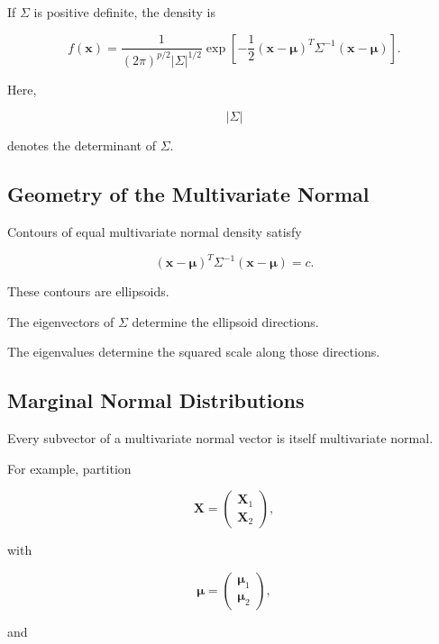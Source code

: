 If \(\Sigma\) is positive definite, the density is

\[
\boxed{
f(\mathbf{x})
=
\frac{
1
}{
(2\pi)^{p/2}
|\Sigma|^{1/2}
}
\exp
\left[
-\frac12
(
\mathbf{x}-\boldsymbol{\mu}
)^T
\Sigma^{-1}
(
\mathbf{x}-\boldsymbol{\mu}
)
\right].
}
\]

Here,

\[
|\Sigma|
\]

denotes the determinant of \(\Sigma\).

\subsection{Geometry of the Multivariate Normal}
\label{subsec:geometry-multivariate-normal}

Contours of equal multivariate normal density satisfy

\[
\boxed{
(
\mathbf{x}-\boldsymbol{\mu}
)^T
\Sigma^{-1}
(
\mathbf{x}-\boldsymbol{\mu}
)
=
c.
}
\]

These contours are ellipsoids.

The eigenvectors of \(\Sigma\) determine the ellipsoid directions.

The eigenvalues determine the squared scale along those directions.

\subsection{Marginal Normal Distributions}
\label{subsec:marginal-multivariate-normal}

Every subvector of a multivariate normal vector is itself multivariate
normal.

For example, partition

\[
\mathbf{X}
=
\begin{pmatrix}
\mathbf{X}_1\\
\mathbf{X}_2
\end{pmatrix},
\]

with

\[
\boldsymbol{\mu}
=
\begin{pmatrix}
\boldsymbol{\mu}_1\\
\boldsymbol{\mu}_2
\end{pmatrix},
\]

and

